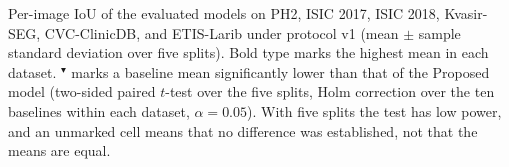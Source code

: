\begin{table}[!t]
\centering
\caption{\label{tab:main_polyp}Per-image IoU of the evaluated models on PH2, ISIC 2017, ISIC 2018, Kvasir-SEG, CVC-ClinicDB, and ETIS-Larib under protocol v1 (mean $\pm$ sample standard deviation over five splits). Bold type marks the highest mean in each dataset. $^{\blacktriangledown}$ marks a baseline mean significantly lower than that of the Proposed model (two-sided paired $t$-test over the five splits, Holm correction over the ten baselines within each dataset, $\alpha=0.05$). With five splits the test has low power, and an unmarked cell means that no difference was established, not that the means are equal.}


\end{table}
